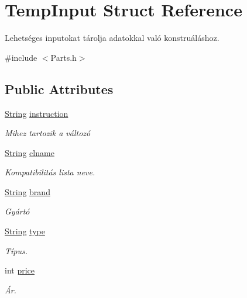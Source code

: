 \hypertarget{struct_temp_input}{}\section{Temp\+Input Struct Reference}
\label{struct_temp_input}


Lehetséges inputokat tárolja adatokkal való konstruáláshoz.  




{\ttfamily \#include $<$Parts.\+h$>$}

\subsection*{Public Attributes}
\begin{DoxyCompactItemize}
\item 
\mbox{\hyperlink{class_string}{String}} \mbox{\hyperlink{struct_temp_input_a693f4a5b4215b51144174287aecab527}{instruction}}
\begin{DoxyCompactList}\small\item\em Mihez tartozik a változó \end{DoxyCompactList}\item 
\mbox{\hyperlink{class_string}{String}} \mbox{\hyperlink{struct_temp_input_a623b1fe5692319aad5c58cbc42bedf9c}{clname}}
\begin{DoxyCompactList}\small\item\em Kompatibilitás lista neve. \end{DoxyCompactList}\item 
\mbox{\hyperlink{class_string}{String}} \mbox{\hyperlink{struct_temp_input_ae61ec1c3c483e583e4975e5c728e4886}{brand}}
\begin{DoxyCompactList}\small\item\em Gyártó \end{DoxyCompactList}\item 
\mbox{\hyperlink{class_string}{String}} \mbox{\hyperlink{struct_temp_input_a1a73f4b9c84caa8c463a4bad03cf433d}{type}}
\begin{DoxyCompactList}\small\item\em Típus. \end{DoxyCompactList}\item 
int \mbox{\hyperlink{struct_temp_input_a6d049ee814f00b43e1d951317261e357}{price}}
\begin{DoxyCompactList}\small\item\em Ár. \end{DoxyCompactList}\item 

\end{DoxyCompactItemize}
